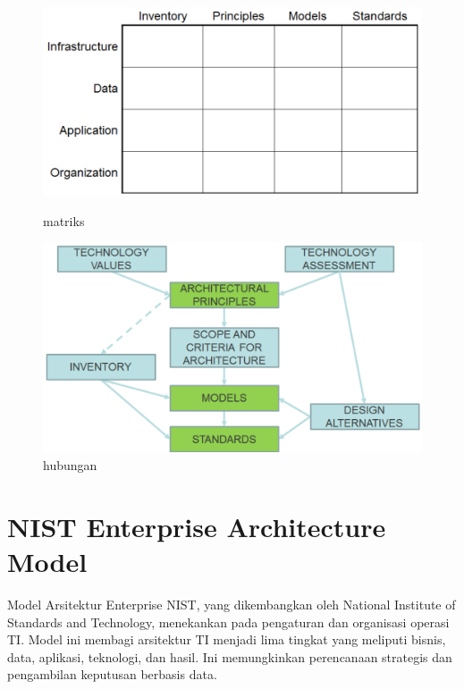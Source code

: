 \begin{center}
	\begin{figure}[ht]
		\begin{minipage}[b]{0.49\linewidth}
			\centering
			\includegraphics[width=\textwidth]{../figures/prism_matrix}
			\caption{matriks}
		\end{minipage}
		\hfill
		\begin{minipage}[b]{0.49\linewidth}
			\centering
			\includegraphics[width=\textwidth]{../figures/prism_relationships}
			\caption{hubungan}
		\end{minipage}
	\end{figure}
\end{center}

\section{NIST Enterprise Architecture Model}
Model Arsitektur Enterprise NIST, yang dikembangkan oleh National Institute of Standards and Technology, menekankan pada pengaturan dan organisasi operasi TI. Model ini membagi arsitektur TI menjadi lima tingkat yang meliputi bisnis, data, aplikasi, teknologi, dan hasil. Ini memungkinkan perencanaan strategis dan pengambilan keputusan berbasis data.

